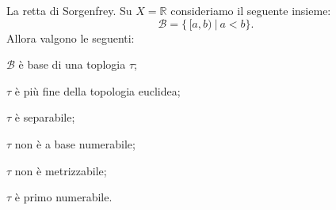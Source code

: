 \documentclass{article}
\begin{document}
\begin{ex}
	La retta di Sorgenfrey. Su $X=\mathbb{R}$ consideriamo il seguente insieme:
	$${\mathcal{B}=\{\,[a, b)\ |\ a<b\}}.$$
    Allora valgono le seguenti:
	\begin{nlist}
		\item $\mathcal{B}$ è base di una toplogia $\tau$;
		\item $\tau$ \`e pi\`u fine della topologia euclidea;
		\item $\tau$ è separabile;
		\item $\tau$ non è a base numerabile;
		\item $\tau$ non è metrizzabile;
		\item $\tau$ è primo numerabile.
	\end{nlist}
\end{ex}
\end{document}
